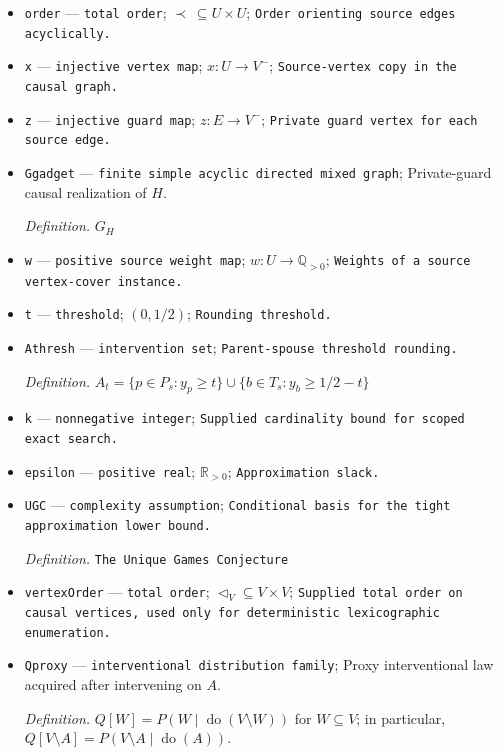 \documentclass{article}
\begin{document}
\begin{itemize}
  \par\smallskip\noindent\emph{Definition.} \(H=(U,E)\)
  \item \texttt{order} --- \texttt{total order}; \(\prec\ \subseteq U\times U\); \texttt{Order orienting source edges acyclically.}
  \item \texttt{x} --- \texttt{injective vertex map}; \(x:U\to V^{-}\); \texttt{Source-\allowbreak{}vertex copy in the causal graph.}
  \item \texttt{z} --- \texttt{injective guard map}; \(z:E\to V^{-}\); \texttt{Private guard vertex for each source edge.}
  \item \texttt{Ggadget} --- \texttt{finite simple acyclic directed mixed graph}; Private-guard causal realization of \(H\).
  \par\smallskip\noindent\emph{Definition.} \(G_H\)
  \item \texttt{w} --- \texttt{positive source weight map}; \(w:U\to\mathbb Q_{>0}\); \texttt{Weights of a source vertex-\allowbreak{}cover instance.}
  \item \texttt{t} --- \texttt{threshold}; \((0,1/2)\); \texttt{Rounding threshold.}
  \item \texttt{Athresh} --- \texttt{intervention set}; \texttt{Parent-\allowbreak{}spouse threshold rounding.}
  \par\smallskip\noindent\emph{Definition.} \(A_t=\{p\in P_s:y_p\geq t\}\cup\{b\in T_s:y_b\geq 1/2-t\}\)
  \item \texttt{k} --- \texttt{nonnegative integer}; \texttt{Supplied cardinality bound for scoped exact search.}
  \item \texttt{epsilon} --- \texttt{positive real}; \(\mathbb R_{>0}\); \texttt{Approximation slack.}
  \item \texttt{UGC} --- \texttt{complexity assumption}; \texttt{Conditional basis for the tight approximation lower bound.}
  \par\smallskip\noindent\emph{Definition.} \texttt{The Unique Games Conjecture}
  \item \texttt{vertexOrder} --- \texttt{total order}; \(\triangleleft_V\subseteq V\times V\); \texttt{Supplied total order on causal vertices,\allowbreak{} used only for deterministic lexicographic enumeration.}
  \item \texttt{Qproxy} --- \texttt{interventional distribution family}; Proxy interventional law acquired after intervening on \(A\).
  \par\smallskip\noindent\emph{Definition.} \(Q[W]=P(W\mid\operatorname{do}(V\setminus W))\) for \(W\subseteq V\); in particular, \(Q[V\setminus A]=P(V\setminus A\mid\operatorname{do}(A))\).
\end{itemize}
\end{document}
